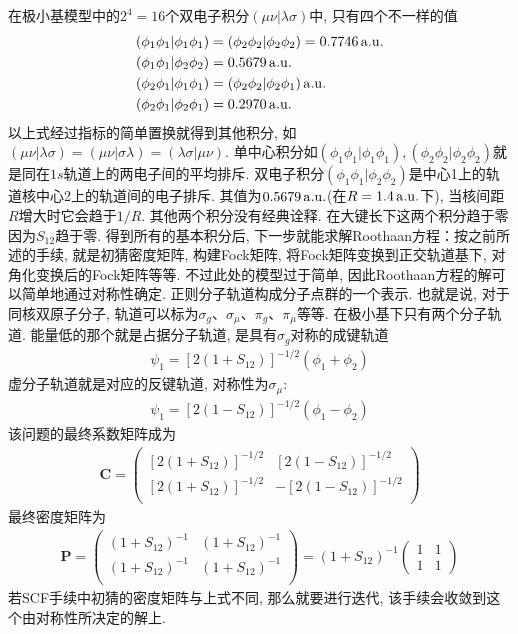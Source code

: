 在极小基模型中的$2^4=16$个双电子积分$(\mu\nu|\lambda\sigma)$中, 
只有四个不一样的值
\begin{equation}
	\begin{split}
		(\phi_1\phi_1|\phi_1\phi_1) & = (\phi_2\phi_2|\phi_2\phi_2) = 0.7746\,\mathrm{a.u.}\\
		(\phi_1\phi_1|\phi_2\phi_2) & =0.5679\,\mathrm{a.u.}\\
		(\phi_2\phi_1|\phi_1\phi_1) & =(\phi_2\phi_2|\phi_2\phi_1)\,\mathrm{a.u.}\\
		(\phi_2\phi_1|\phi_2\phi_1) & =0.2970\,\mathrm{a.u.}
	\end{split}
\end{equation}
以上式经过指标的简单置换就得到其他积分, 
如$(\mu\nu|\lambda\sigma)=(\mu\nu|\sigma\lambda)=(\lambda\sigma|\mu\nu)$. 
单中心积分如$(\phi_1\phi_1|\phi_1\phi_1),(\phi_2\phi_2|\phi_2\phi_2)$就是同在$1s$轨道上的两电子间的平均排斥. 
双电子积分$(\phi_1\phi_1|\phi_2\phi_2)$是中心1上的轨道核中心2上的轨道间的电子排斥. 
其值为$0.5679\,\mathrm{a.u.}$(在$R=1.4\,\mathrm{a.u.}$下), 
当核间距$R$增大时它会趋于$1/R$. 
其他两个积分没有经典诠释. 
在大键长下这两个积分趋于零因为$S_{12}$趋于零. 
得到所有的基本积分后, 
下一步就能求解Roothaan方程：按之前所述的手续, 
就是初猜密度矩阵, 
构建Fock矩阵, 
将Fock矩阵变换到正交轨道基下, 
对角化变换后的Fock矩阵等等. 
不过此处的模型过于简单, 
因此Roothaan方程的解可以简单地通过对称性确定. 
正则分子轨道构成分子点群的一个表示. 
也就是说, 
对于同核双原子分子, 
轨道可以标为$\sigma_g$、$\sigma_\mu$、$\pi_g$、$\pi_\mu$等等. 
在极小基下只有两个分子轨道. 
能量低的那个就是占据分子轨道, 
是具有$\sigma_g$对称的成键轨道
\begin{align}
	\psi_1 = [2(1+S_{12})]^{-1/2}(\phi_1+\phi_2)
\end{align}
虚分子轨道就是对应的反键轨道, 
对称性为$\sigma_\mu$:
\begin{align}
	\psi_1 = [2(1-S_{12})]^{-1/2}(\phi_1-\phi_2)
\end{align}
该问题的最终系数矩阵成为
\begin{align}
	\mathbf{C}=
	\begin{pmatrix}
		[2(1+S_{12})]^{-1/2} & [2(1-S_{12})]^{-1/2}\\
		[2(1+S_{12})]^{-1/2} & -[2(1-S_{12})]^{-1/2}\\
	\end{pmatrix}
\end{align}
最终密度矩阵为
\begin{align}
	\mathbf{P}=
	\begin{pmatrix}
		(1+S_{12})^{-1} & (1+S_{12})^{-1} \\
		(1+S_{12})^{-1} & (1+S_{12})^{-1} \\
	\end{pmatrix}
	=(1+S_{12})^{-1} 
	\begin{pmatrix}
		1&1\\1&1
	\end{pmatrix}
\end{align}
若SCF手续中初猜的密度矩阵与上式不同, 
那么就要进行迭代, 
该手续会收敛到这个由对称性所决定的解上.

